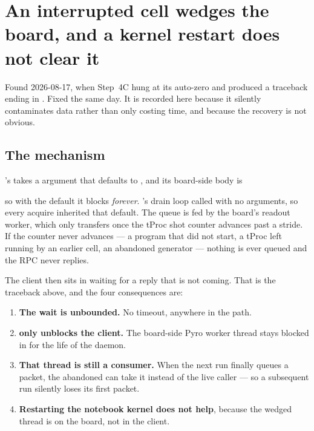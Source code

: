 \section{An interrupted cell wedges the board, and a kernel restart does not clear it}
\label{sec:wedge}

Found 2026-08-17, when Step~4C hung at its auto-zero  and 
produced a traceback ending in . Fixed the
same day. It is recorded here because it silently contaminates data rather than
only costing time, and because the recovery is not obvious.

\subsection{The mechanism}

's  takes a  argument that defaults to
, and its board-side body is

\begin{center}
\end{center}

\noindent so with the default it blocks \emph{forever}. 's drain loop
called  with no arguments, so every acquire inherited that
default. The queue is fed by the board's readout worker, which only transfers once
the tProc shot counter advances past a stride. If the counter never advances --- a
program that did not start, a tProc left running by an earlier cell, an abandoned
 generator --- nothing is ever queued and the RPC never replies.

The client then sits in  waiting for a reply that
is not coming. That is the traceback above, and the four consequences are:

\begin{enumerate}
  \item \textbf{The wait is unbounded.} No timeout, anywhere in the path.
  \item \textbf{ only unblocks the client.} The board-side Pyro worker
        thread stays blocked in  for the life of the daemon.
  \item \textbf{That thread is still a consumer.} When the next run finally queues a
        packet, the abandoned  can take it instead of the live caller ---
        so a subsequent run silently loses its first packet.
  \item \textbf{Restarting the notebook kernel does not help}, because the wedged
        thread is on the board, not in the client.
\end{enumerate}

